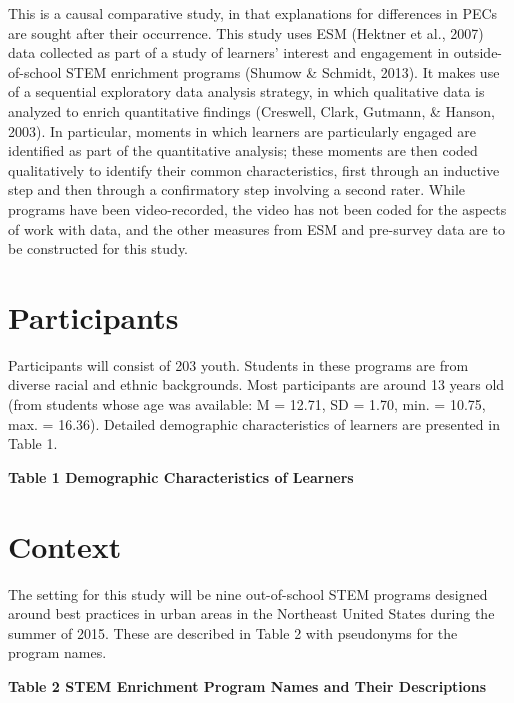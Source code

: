 \documentclass[]{msu-thesis}
\theoremstyle{definition}
\theoremstyle{definition}
\theoremstyle{definition}
\theoremstyle{remark}
\begin{document}
This is a causal comparative study, in that explanations for differences
in PECs are sought after their occurrence. This study uses ESM (Hektner
et al., 2007) data collected as part of a study of learners' interest
and engagement in outside-of-school STEM enrichment programs (Shumow \&
Schmidt, 2013). It makes use of a sequential exploratory data analysis
strategy, in which qualitative data is analyzed to enrich quantitative
findings (Creswell, Clark, Gutmann, \& Hanson, 2003). In particular,
moments in which learners are particularly engaged are identified as
part of the quantitative analysis; these moments are then coded
qualitatively to identify their common characteristics, first through an
inductive step and then through a confirmatory step involving a second
rater. While programs have been video-recorded, the video has not been
coded for the aspects of work with data, and the other measures from ESM
and pre-survey data are to be constructed for this study.

\section{Participants}\label{participants}

Participants will consist of 203 youth. Students in these programs are
from diverse racial and ethnic backgrounds. Most participants are around
13 years old (from students whose age was available: M = 12.71, SD =
1.70, min. = 10.75, max. = 16.36). Detailed demographic characteristics
of learners are presented in Table 1.

\textbf{Table 1 Demographic Characteristics of Learners}

\section{Context}\label{context}

The setting for this study will be nine out-of-school STEM programs
designed around best practices in urban areas in the Northeast United
States during the summer of 2015. These are described in Table 2 with
pseudonyms for the program names.

\textbf{Table 2 STEM Enrichment Program Names and Their Descriptions}
\end{document}
